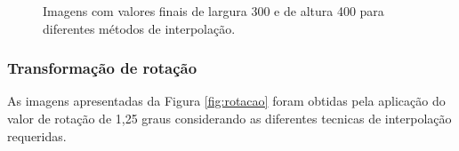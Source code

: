 \documentclass{article}
\begin{document}
\begin{figure}[!htp]
{{	}}%
	\caption{Imagens com valores finais de largura 300 e de altura 400 para diferentes métodos de interpolação.}%
	\label{fig:escalad}%
\end{figure}


\newpage
\subsubsection{Transformação de rotação}
As imagens apresentadas da Figura \ref{fig:rotacao} foram obtidas pela aplicação do valor de rotação de 1,25 graus considerando as diferentes tecnicas de interpolação requeridas.
\end{document}
